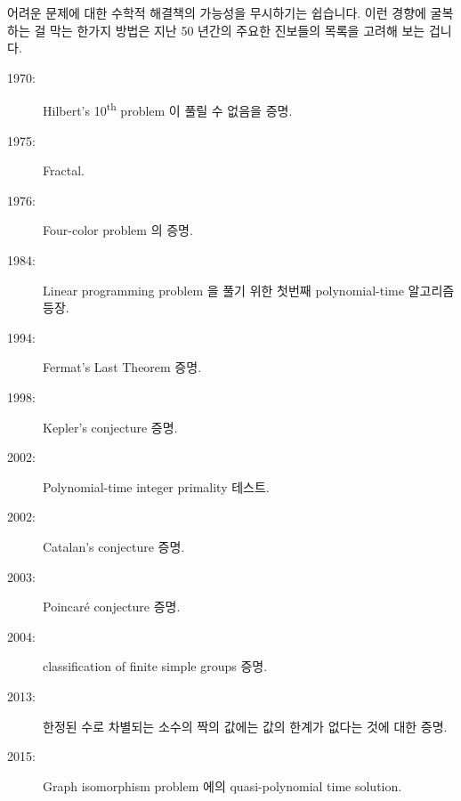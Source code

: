 어려운 문제에 대한 수학적 해결책의 가능성을 무시하기는 쉽습니다.
이런 경향에 굴복하는 걸 막는 한가지 방법은 지난 50 년간의 주요한 진보들의
목록을 고려해 보는 겁니다.

\begin{description}
\item[1970:] Hilbert's 10\textsuperscript{th} problem 이 풀릴 수 없음을 증명.
\item[1975:] Fractal.
\item[1976:] Four-color problem 의 증명.
\item[1984:] Linear programming problem 을 풀기 위한 첫번째 polynomial-time
	     알고리즘 등장.
\item[1994:] Fermat's Last Theorem 증명.
\item[1998:] Kepler's conjecture 증명.
\item[2002:] Polynomial-time integer primality 테스트.
\item[2002:] Catalan's conjecture 증명.
\item[2003:] Poincar\'e conjecture 증명.
\item[2004:] classification of finite simple groups 증명.
\item[2013:] 한정된 수로 차별되는 소수의 짝의 값에는 값의 한계가 없다는 것에
	     대한 증명.
\item[2015:] Graph isomorphism problem 에의 quasi-polynomial time solution.

\end{description}

